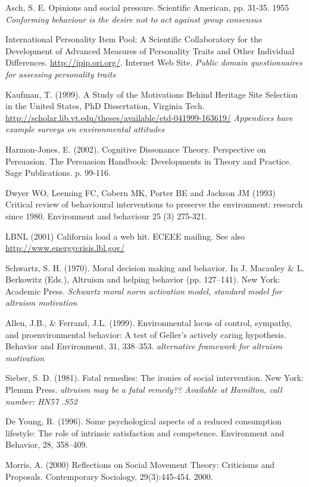 Asch, S. E. Opinions and social pressure. Scientiﬁc American, pp. 31-35. 1955 \emph{Conforming behaviour is the desire not to act against group consensus}

International Personality Item Pool: A Scientific Collaboratory for the Development of Advanced Measures of Personality Traits and Other Individual Differences. \url{http://ipip.ori.org/}. Internet Web Site. \emph{Public domain questionnaires for assessing personality traits}

Kaufman, T. (1999). A Study of the Motivations Behind Heritage Site Selection in the United States, PhD Dissertation, Virginia Tech. \url{http://scholar.lib.vt.edu/theses/available/etd-041999-163619/} \emph{Appendices have example surveys on environmental attitudes}

Harmon-Jones, E. (2002). Cognitive Dissonance Theory. Perspective on Persuasion. The Persuasion Handbook:  Developments in Theory and Practice. Sage Publications. p. 99-116.

Dwyer WO, Leeming FC, Cobern MK, Porter BE and Jackson JM (1993) Critical review of behavioural interventions to preserve the environment: research since 1980. Environment and behaviour 25 (3) 275-321.

LBNL (2001) California load a web hit. ECEEE mailing. See also \url{http://www.energycrisis.lbl.gov/}

Schwartz, S. H. (1970). Moral decision making and behavior. In J. Macauley \& L. Berkowitz (Eds.), Altruism and helping behavior (pp. 127–141). New York: Academic Press. \emph{Schwartz moral norm activation model, standard model for altruism motivation}

Allen, J.B., \& Ferrand, J.L. (1999). Environmental locus of control, sympathy, and proenvironmental behavior: A test of Geller’s actively caring hypothesis. Behavior and Environment, 31, 338–353. \emph{alternative framework for altruism motivation}

Sieber, S. D. (1981). Fatal remedies: The ironies of social intervention. New York: Plenum Press. \emph{altruism may be a fatal remedy?? Available at Hamilton, call number: HN57 .S52}

De Young, R. (1996). Some psychological aspects of a reduced consumption lifestyle: The role of intrinsic satisfaction and competence. Environment and Behavior, 28, 358–409.

Morris, A. (2000) Reflections on Social Movement Theory: Criticisms and Proposals. Contemporary Sociology, 29(3):445-454. 2000.

